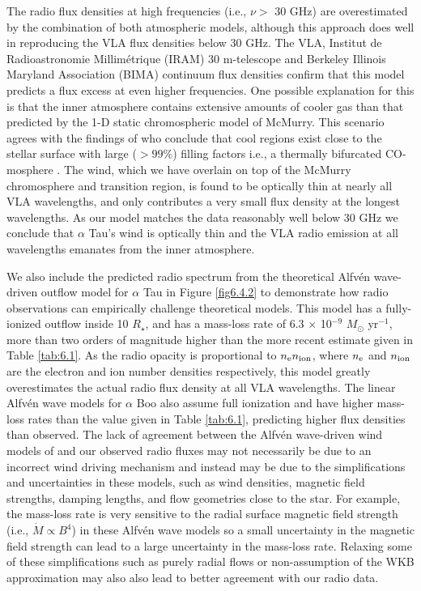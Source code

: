 The radio flux densities at high frequencies (i.e., $\nu >$ 30 GHz) are overestimated by the combination of both atmospheric models, although this approach does well in reproducing the VLA flux densities below 30 GHz. The VLA, Institut de Radioastronomie Millim\'{e}trique (IRAM) 30 m-telescope and Berkeley Illinois Maryland Association (BIMA) continuum flux densities confirm that this model predicts a flux excess at even higher frequencies. One possible explanation for this is that the inner atmosphere contains extensive amounts of cooler gas than that predicted by the 1-D static chromospheric model of McMurry. This scenario agrees with the findings of \cite{wiedemann_1994} who conclude that cool regions exist close to the stellar surface with large ($> 99 \%$) filling factors i.e., a thermally bifurcated CO-mosphere \citep{ayres_1996}. The wind, which we have overlain on top of the McMurry chromosphere and transition region, is found to be optically thin at nearly all VLA wavelengths, and only contributes a very small flux density at the longest wavelengths. As our model matches the data reasonably well below 30 GHz we conclude that $\alpha$ Tau's wind is optically thin and the VLA radio emission at all wavelengths emanates from the inner atmosphere. 

We also include the predicted radio spectrum from the theoretical Alfv\'{e}n wave-driven outflow model for $\alpha$ Tau \citep{krogulec_1989} in Figure \ref{fig6.4.2} to demonstrate how radio observations can empirically challenge theoretical models. This model has a fully-ionized outflow inside 10 $R_{\star}$, and has a mass-loss rate of  6.3 $\times$ 10$^{-9}$ $M_{\odot}$ yr$^{-1}$, more than two orders of magnitude higher than the more recent estimate given in Table \ref{tab:6.1}. As the radio opacity is proportional to $n _{\rm{e}} n _{\rm{ion}}$, where $n_{\rm{e}}$ and $n_{\rm{ion}}$ are the electron and ion number densities respectively, this model greatly overestimates the actual radio flux density at all VLA wavelengths. The linear Alfv\'{e}n wave models for $\alpha$ Boo \citep{krogulec_1988} also assume full ionization and have higher mass-loss rates than the value given in Table \ref{tab:6.1}, predicting higher flux densities than observed. The lack of agreement between the Alfv\'en wave-driven wind models of \cite{krogulec_1988,krogulec_1989} and our observed radio fluxes may not necessarily be due to an incorrect  wind driving mechanism and instead may be due to the simplifications and  uncertainties in these models, such as wind densities, magnetic field strengths, damping lengths, and flow geometries close to the star. For example, the mass-loss rate is very sensitive to the radial surface magnetic field strength (i.e., $\dot{M} \propto B^4$) in these Alfv\'en wave models \citep{holzer_1983} so a small uncertainty in the magnetic field strength can lead to a large uncertainty in the mass-loss rate. Relaxing some of these simplifications such as purely radial flows or non-assumption of the WKB approximation \citep{charbonneau_1995} may also also lead to better agreement with our radio data.

